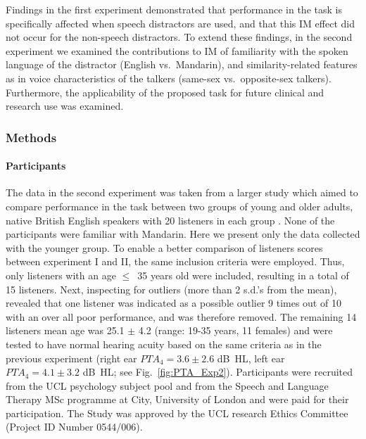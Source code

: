 \documentclass[a4paper, twoside]{templates/ociamthesis}
\begin{document}
Findings in the first experiment demonstrated that performance in the task is specifically affected when speech distractors are used, and that this IM effect did not occur for the non-speech distractors. To extend these findings, in the second experiment we examined the contributions to IM of familiarity with the spoken language of the distractor (English vs.~Mandarin), and similarity-related features as in voice characteristics of the talkers (same-sex vs.~opposite-sex talkers). Furthermore, the applicability of the proposed task for future clinical and research use was examined.\\

\hypertarget{methods-1}{%
\subsubsection{Methods}\label{methods-1}}

\hypertarget{participants-1}{%
\paragraph{Participants}\label{participants-1}}

\hfill\break
The data in the second experiment was taken from a larger study which aimed to compare performance in the task between two groups of young and older adults, native British English speakers with 20 listeners in each group \autocite{Huang2018}. None of the participants were familiar with Mandarin. Here we present only the data collected with the younger group. To enable a better comparison of listeners scores between experiment I and II, the same inclusion criteria were employed. Thus, only listeners with an age \(\leq\)~35 years old were included, resulting in a total of 15 listeners. Next, inspecting for outliers (more than 2 s.d.'s from the mean), revealed that one listener was indicated as a possible outlier 9 times out of 10 with an over all poor performance, and was therefore removed. The remaining 14 listeners mean age was 25.1 \(\pm\) 4.2 (range: 19-35 years, 11 females) and were tested to have normal hearing acuity based on the same criteria as in the previous experiment (right ear \(PTA_{4}=3.6 \pm 2.6\) dB~HL, left ear \(PTA_{4}=4.1 \pm 3.2\) dB~HL; see Fig.~\ref{fig:PTA_Exp2}). Participants were recruited from the UCL psychology subject pool and from the Speech and Language Therapy MSc programme at City, University of London and were paid for their participation. The Study was approved by the UCL research Ethics Committee (Project ID Number 0544/006).\\
\end{document}
